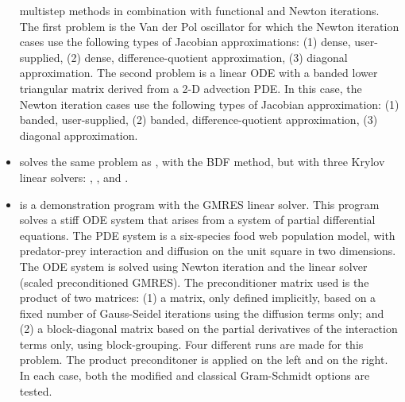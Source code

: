 \begin{itemize}
  multistep methods in combination with functional and Newton
  iterations. 
  \newline
  The first problem is the Van der Pol oscillator for which 
  the Newton iteration cases use the following types of Jacobian approximations:
  (1) dense, user-supplied, (2) dense, difference-quotient approximation, 
  (3) diagonal approximation. The second problem is a linear ODE with a
  banded lower triangular matrix derived from a 2-D advection PDE. In this
  case, the Newton iteration cases use the following types of Jacobian
  approximation: (1) banded, user-supplied, (2) banded, difference-quotient
  approximation, (3) diagonal approximation.
\item {}
  solves the same problem as , with the BDF method, but with
  three Krylov linear solvers: {\cvspgmr}, {\cvspbcg}, and {\cvsptfqmr}.
\item {}
  is a demonstration program with the GMRES linear solver.
  \newline
  This program solves a stiff ODE system that arises from a system     
  of partial differential equations.  The PDE system is a six-species
  food web population model, with predator-prey interaction and diffusion 
  on the unit square in two dimensions.
  \newline
  The ODE system is solved using Newton iteration and the      
  {\cvspgmr} linear solver (scaled preconditioned GMRES).
  \newline
  The preconditioner matrix used is the product of two matrices:         
  (1) a matrix, only defined implicitly, based on a fixed number of     
  Gauss-Seidel iterations using the diffusion terms only; and               
  (2) a block-diagonal matrix based on the partial derivatives of the   
  interaction terms only, using block-grouping.                          
  \newline
  Four different runs are made for this problem.                        
  The product preconditoner is applied on the left and on the right.    
  In each case, both the modified and classical Gram-Schmidt options    
  are tested.



\end{itemize}
